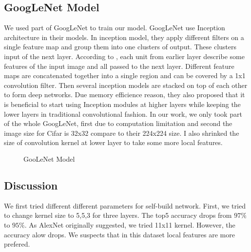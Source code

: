 \documentclass{article} %
\begin{document}
 \subsection{GoogLeNet Model }
We used part of GoogLeNet to train our model. GoogLeNet use Inception architecture in their models. In inception model, they apply different filters on a single feature map and group them into one clusters of output. These clusters input of the next layer. According to \cite{Googlenet}, each unit from earlier layer describe some features of the input image and all passed to the next layer. Different feature maps are concatenated together into a single region and can be covered by a 1x1 convolution filter. Then several inception models are stacked on top of each other to form deep networks. Due memory efficience reason, they also proposed that it is beneficial to start using Inception modules at higher layers while keeping the lower layers in traditional convolutional fashion. In our work, we only took part of the whole GoogLeNet, first due to computation limitation and second the image size for Cifar is 32x32 compare to their 224x224 size. I also shrinked the size of convolution kernel at lower layer to take some more local features.
 \begin{figure}[h]
    \centering
    \qquad
    \caption{GooLeNet Model}
    \label{fig:goog}
\end{figure}

\subsection{Discussion}
We first tried different different parameters for self-build network. First, we tried to change kernel
size to 5,5,3 for three layers. The top5 accuracy drops from $97\%$ to $95\%$. As AlexNet originally 
suggested, we tried 11x11 kernel. However, the accuracy alow drops. We suspects that in this dataset
local features are more prefered. \
\end{document}
